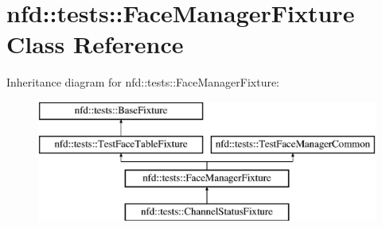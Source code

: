 \hypertarget{classnfd_1_1tests_1_1FaceManagerFixture}{}\section{nfd\+:\+:tests\+:\+:Face\+Manager\+Fixture Class Reference}
\label{classnfd_1_1tests_1_1FaceManagerFixture}
Inheritance diagram for nfd\+:\+:tests\+:\+:Face\+Manager\+Fixture\+:\begin{figure}[H]
\begin{center}
\leavevmode
\includegraphics[height=4.000000cm]{classnfd_1_1tests_1_1FaceManagerFixture}
\end{center}
\end{figure}
